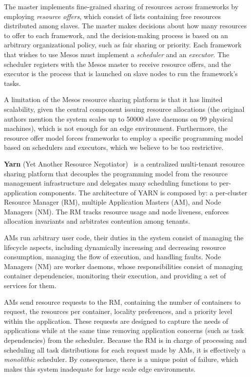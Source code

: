 The master implements fine-grained sharing of resources across frameworks by employing \textit{resource offers}, which consist of lists containing free resources distributed among slaves. The master makes decisions about how many resources to offer to each framework, and the decision-making process is based on an arbitrary organizational policy, such as fair sharing or priority. Each framework that wishes to use Mesos must implement a \textit{scheduler} and an \textit{executor}. The scheduler registers with the Mesos master to receive resource offers, and the executor is the process that is launched on slave nodes to run the framework's tasks.

A limitation of the Mesos resource sharing platform is that it has limited scalability, given the central component issuing resource allocations (the original authors mention the system scales up to 50000 slave daemons on 99 physical machines), which is not enough for an edge environment. Furthermore, the resource offer model forces frameworks to employ a specific programming model based on schedulers and executors, which we believe to be too restrictive.

\textbf{Yarn} (Yet Another Resource Negotiator)~\cite{Vavilapalli2013ApacheHY} is a centralized multi-tenant resource sharing platform that decouples the programming model from the resource management infrastructure and delegates many scheduling functions to per-application components. The architecture of YARN is composed by: a per-cluster Resource Manager (RM), multiple Application Masters (AM), and Node Managers (NM). The RM tracks resource usage and node liveness, enforces allocation invariants and arbitrates contention among tenants.

AMs run arbitrary user code, their duties in the system consist of managing the lifecycle aspects, including dynamically increasing and decreasing resource consumption, managing the flow of execution, and handling faults. Node Managers (NM) are worker daemons, whose responsibilities consist of managing container dependencies, monitoring their execution, and providing a set of services for them.

AMs send resource requests to the RM, containing the number of containers to request, the resources per container, locality preferences, and a priority level within the application. These requests are designed to capture the needs of applications while at the same time removing application concerns (such as task dependencies) from the scheduler. Because the RM is in charge of processing and scheduling all task distributions for each request made by AMs, it is effectively a \textit{monolithic} scheduler. By consequence, there is a unique point of failure, which makes this system inadequate for large scale edge environments.

